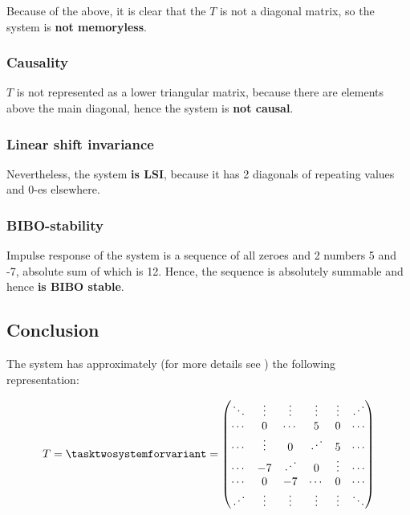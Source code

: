 \documentclass[a4paper]{article}
\theoremstyle{break}
\theoremstyle{break}
\begin{document}
Because of the above, it is clear that the $T$ is not a diagonal matrix, so the system is \textbf{not memoryless}.

\subsubsection*{Causality}

$T$ is not represented as a lower triangular matrix, because there are elements above the main diagonal, hence the system is \textbf{not causal}.

\subsubsection*{Linear shift invariance}

Nevertheless, the system \textbf{is LSI}, because it has 2 diagonals of repeating values and 0-es elsewhere.

\subsubsection*{BIBO-stability}

Impulse response of the system is a sequence of all zeroes and 2 numbers 5 and -7, absolute sum of which is 12. Hence, the sequence is absolutely summable and hence \textbf{is BIBO stable}.

\subsection*{Conclusion}

The system has approximately (for more details see ) the following representation:

\begin{equation*}
  T = \tasktwosystemforvariant =
    \begin{pmatrix*}
      \ddots  & \vdots & \vdots  & \vdots  & \vdots & \iddots \\
      \cdots  & 0      & \cdots  & 5       & 0      & \cdots \\
      \cdots  & \vdots & 0       & \iddots & 5      & \cdots \\
      \cdots  & -7     & \iddots & 0       & \vdots & \cdots \\
      \cdots  & 0      & -7      & \cdots  & 0      & \cdots \\
      \iddots & \vdots & \vdots  & \vdots  & \vdots & \ddots
    \end{pmatrix*}
\end{equation*}
\end{document}
